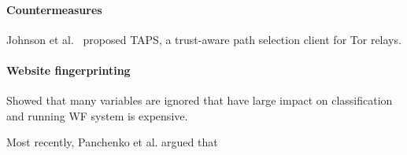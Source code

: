 \paragraph{Countermeasures}
\cite{Edman2009a}
\cite{Nithyanand2016a}
\cite{Akhoondi2012a}


\cite{Mathewson2004a}
\cite{Mittal2011a}
\cite{Wacek2013a}
\cite{Johnson2013a}
\cite{Juen2015a}
\cite{Danezis2004a}
\cite{Levine2004a}
\cite{Bauer2007a}
\cite{Dingledine2009a}


Johnson et al.~\cite{Johnson2015a} proposed TAPS, a trust-aware path selection
client for Tor relays.

\cite{torstinks}

\paragraph{Website fingerprinting}
\cite{Juarez2014a}
Showed that many variables are ignored that have large impact on classification
and running WF system is expensive.

Most recently, Panchenko et al. argued that 
\cite{Panchenko2016a}
